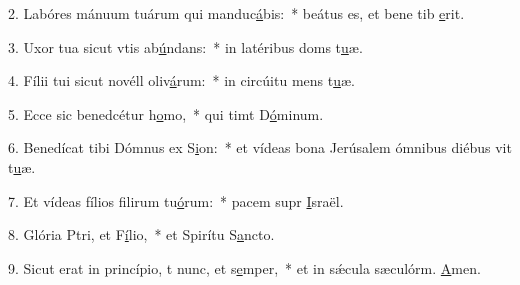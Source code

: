 2. Labóres mánuum tuárum qui manduc\uline{á}bis:~* beátus es, et bene tib \uline{e}rit.\par 
3. Uxor tua sicut vtis ab\uline{ú}ndans:~* in latéribus doms t\uline{u}æ.\par 
4. Fílii tui sicut novéll oliv\uline{á}rum:~* in circúitu mens t\uline{u}æ.\par 
5. Ecce sic benedcétur h\uline{o}mo,~* qui timt D\uline{ó}minum.\par 
6. Benedícat tibi Dómnus ex S\uline{i}on:~* et vídeas bona Jerúsalem ómnibus diébus vit t\uline{u}æ.\par 
7. Et vídeas fílios filirum tu\uline{ó}rum:~* pacem supr \uline{I}sraël.\par 
8. Glória Ptri, et F\uline{í}lio,~* et Spirítu S\uline{a}ncto.\par 
9. Sicut erat in princípio, t nunc, et s\uline{e}mper,~* et in sǽcula sæculórm. \uline{A}men.\par 
